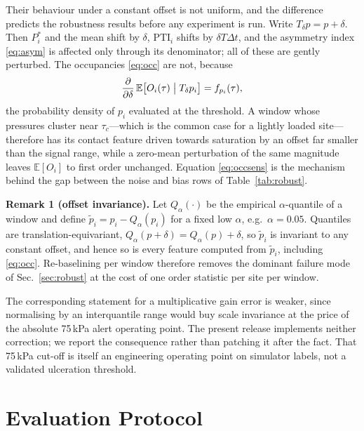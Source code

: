 \documentclass[10pt,conference,a4paper]{IEEEtran}
\begin{document}
Their behaviour under a constant offset is not uniform, and the difference
predicts the robustness results before any experiment is run. Write
$T_\delta p = p+\delta$. Then $P^{\ast}_i$ and the mean shift by $\delta$,
$\mathrm{PTI}_i$ shifts by $\delta T \Delta t$, and the asymmetry index
\eqref{eq:asym} is affected only through its denominator; all of these are
gently perturbed. The occupancies \eqref{eq:occ} are not, because
\begin{equation}
\frac{\partial}{\partial\delta}\,
\mathbb{E}\!\left[O_i(\tau)\bigm| T_\delta p_i\right]
   = f_{p_i}(\tau),
\label{eq:occsens}
\end{equation}
the probability density of $p_i$ evaluated at the threshold. A window whose
pressures cluster near $\tau_c$---which is the common case for a lightly loaded
site---therefore has its contact feature driven towards saturation by an offset
far smaller than the signal range, while a zero-mean perturbation of the same
magnitude leaves $\mathbb{E}[O_i]$ to first order unchanged. Equation
\eqref{eq:occsens} is the mechanism behind the gap between the noise and bias
rows of Table~\ref{tab:robust}.

\medskip
\noindent\textbf{Remark 1 (offset invariance).}\;
Let $Q_\alpha(\cdot)$ be the empirical $\alpha$-quantile of a window and define
$\tilde p_i = p_i - Q_{\alpha}(p_i)$ for a fixed low $\alpha$, e.g.\
$\alpha=0.05$. Quantiles are translation-equivariant,
$Q_\alpha(p+\delta)=Q_\alpha(p)+\delta$, so $\tilde p_i$ is invariant to any
constant offset, and hence so is every feature computed from $\tilde p_i$,
including \eqref{eq:occ}. Re-baselining per window therefore removes the
dominant failure mode of Sec.~\ref{sec:robust} at the cost of one order
statistic per site per window.

\medskip
\noindent The corresponding statement for a multiplicative gain error is
weaker, since normalising by an interquantile range would buy scale invariance
at the price of the absolute 75\,kPa alert operating point. The present release
implements neither correction; we report the consequence rather than patching
it after the fact. That 75\,kPa cut-off is itself an engineering operating
point on simulator labels, not a validated ulceration threshold.

\section{Evaluation Protocol}
\label{sec:proto}
\end{document}
